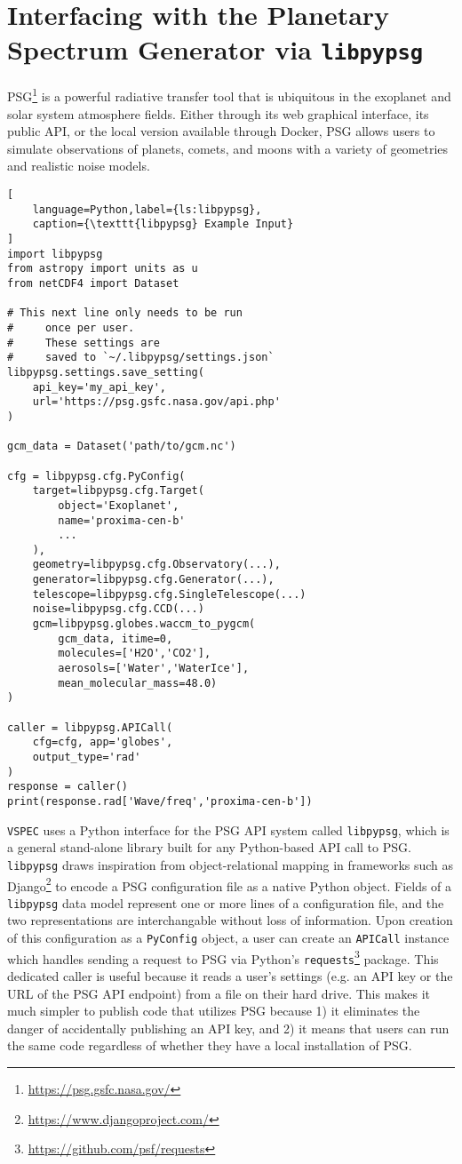 \documentclass[linenumbers,5p,twocolumn,authoryear]{elsarticle}
\newcommand{\vspec}[1]{\texttt{VSPEC}#1}
\begin{document}
\section{Interfacing with the Planetary Spectrum Generator via \texttt{libpypsg}}
\label{sec:libpypsg}
PSG\footnote{\url{https://psg.gsfc.nasa.gov/}} \citep{villanueva2018} is a powerful radiative transfer tool that is ubiquitous in the exoplanet and solar system atmosphere fields. Either through its web graphical interface, its public API, or the local version available through Docker, PSG allows users to simulate observations of planets, comets, and moons with a variety of geometries and realistic noise models.

\begin{lstlisting}[
    language=Python,label={ls:libpypsg},
    caption={\texttt{libpypsg} Example Input}
]
import libpypsg
from astropy import units as u
from netCDF4 import Dataset

# This next line only needs to be run
#     once per user.
#     These settings are 
#     saved to `~/.libpypsg/settings.json`
libpypsg.settings.save_setting(
    api_key='my_api_key',
    url='https://psg.gsfc.nasa.gov/api.php'
)

gcm_data = Dataset('path/to/gcm.nc')

cfg = libpypsg.cfg.PyConfig(
    target=libpypsg.cfg.Target(
        object='Exoplanet',
        name='proxima-cen-b'
        ...
    ),
    geometry=libpypsg.cfg.Observatory(...),
    generator=libpypsg.cfg.Generator(...),
    telescope=libpypsg.cfg.SingleTelescope(...)
    noise=libpypsg.cfg.CCD(...)
    gcm=libpypsg.globes.waccm_to_pygcm(
        gcm_data, itime=0,
        molecules=['H2O','CO2'],
        aerosols=['Water','WaterIce'],
        mean_molecular_mass=48.0)
)

caller = libpypsg.APICall(
    cfg=cfg, app='globes',
    output_type='rad'
)
response = caller()
print(response.rad['Wave/freq','proxima-cen-b'])
\end{lstlisting}

\vspec{} uses a Python interface for the PSG API system called \texttt{libpypsg}, which is a general stand-alone library built for any Python-based API call to PSG. \texttt{libpypsg} draws inspiration from object-relational mapping in frameworks such as Django\footnote{\url{https://www.djangoproject.com/}} to encode a PSG configuration file as a native Python object. Fields of a \texttt{libpypsg} data model represent one or more lines of a configuration file, and the two representations are interchangable without loss of information. Upon creation of this configuration as a \texttt{PyConfig} object, a user can create an \texttt{APICall} instance which handles sending a request to PSG via Python's \texttt{requests}\footnote{\url{https://github.com/psf/requests}} package. This dedicated caller is useful because it reads a user's settings (e.g. an API key or the URL of the PSG API endpoint) from a file on their hard drive. This makes it much simpler to publish code that utilizes PSG because 1) it eliminates the danger of accidentally publishing an API key, and 2) it means that users can run the same code regardless of whether they have a local installation of PSG.
\end{document}
